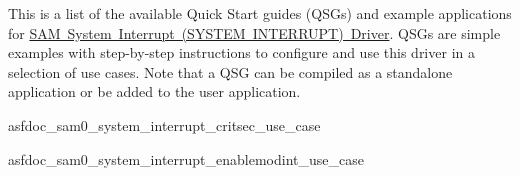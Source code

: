This is a list of the available Quick Start guides (Q\+S\+Gs) and example applications for \mbox{\hyperlink{group__asfdoc__sam0__system__interrupt__group}{S\+AM System Interrupt (S\+Y\+S\+T\+EM I\+N\+T\+E\+R\+R\+U\+PT) Driver}}. Q\+S\+Gs are simple examples with step-\/by-\/step instructions to configure and use this driver in a selection of use cases. Note that a Q\+SG can be compiled as a standalone application or be added to the user application.


\begin{DoxyItemize}
\item asfdoc\+\_\+sam0\+\_\+system\+\_\+interrupt\+\_\+critsec\+\_\+use\+\_\+case
\item asfdoc\+\_\+sam0\+\_\+system\+\_\+interrupt\+\_\+enablemodint\+\_\+use\+\_\+case 
\end{DoxyItemize}
